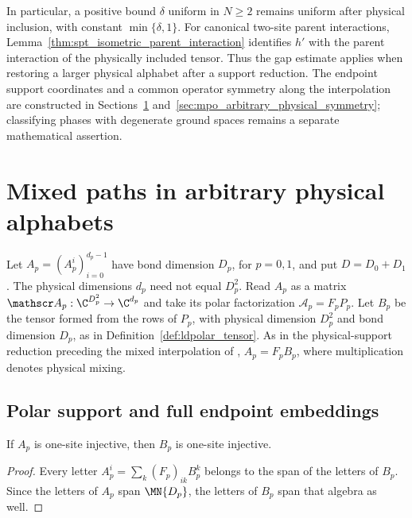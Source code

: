 In particular, a positive bound $\delta$ uniform in $N\geq2$ remains
uniform after physical inclusion, with constant $\min\{\delta,1\}$.
For canonical two-site parent interactions,
Lemma~\ref{thm:spt_isometric_parent_interaction} identifies $h'$ with
the parent interaction of the physically included tensor. Thus the gap
estimate applies when restoring a larger physical alphabet after a
support reduction. The endpoint support coordinates and a common
operator symmetry along the interpolation are constructed in
Sections~\ref{sec:mpo_arbitrary_physical_path}
and~\ref{sec:mpo_arbitrary_physical_symmetry}; classifying phases with
degenerate ground spaces remains a separate mathematical assertion.

\section{Mixed paths in arbitrary physical alphabets}
\label{sec:mpo_arbitrary_physical_path}

Let $A_p=(A_p^i)_{i=0}^{d_p-1}$ have bond dimension $D_p$, for
$p=0,1$, and put $D=D_0+D_1$. The physical dimensions $d_p$ need
not equal $D_p^2$. Read $A_p$ as a matrix
$\mathscr A_p:\C^{D_p^2}\to\C^{d_p}$ and take its polar
factorization $\mathscr A_p=F_pP_p$. Let $B_p$ be the tensor formed
from the rows of $P_p$, with physical dimension $D_p^2$ and bond
dimension $D_p$, as in Definition~\ref{def:ldpolar_tensor}.
As in the physical-support reduction preceding the mixed interpolation of
\cite[Section~5]{GarreRubio2023MPOSym}, $A_p=F_pB_p$, where multiplication
denotes physical mixing.

\subsection{Polar support and full endpoint embeddings}

\begin{lemma}
    \label{thm:mpo_polar_support_injective}
    \leanok
    If $A_p$ is one-site injective, then $B_p$ is one-site injective.
\end{lemma}
\begin{proof}\leanok
    Every letter $A_p^i=\sum_k(F_p)_{ik}B_p^k$ belongs to the span
    of the letters of $B_p$. Since the letters of $A_p$ span
    $\MN{D_p}$, the letters of $B_p$ span that algebra as well.
\end{proof}

